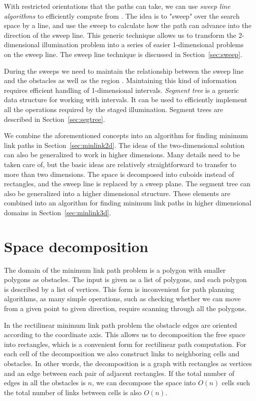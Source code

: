 \documentclass[english,gradu]{tktltiki2018}
\begin{document}
With restricted orientations that the paths can take, we can use \emph{sweep line algorithms} to efficiently compute  from .
The idea is to "sweep" over the search space by a line, and use the sweep to calculate how the path can advance into the direction of the sweep line.
This generic technique allows us to transform the 2-dimensional illumination problem into a series of easier 1-dimensional problems on the sweep line.
The sweep line technique is discussed in Section~\ref{sec:sweep}.

During the sweeps we need to maintain the relationship between the sweep line and the obstacles as well as the region .
Maintaining this kind of information requires efficient handling of 1-dimensional intervals.
\emph{Segment tree} is a generic data structure for working with intervals.
It can be used to efficiently implement all the operations required by the staged illumination.
Segment trees are described in Section~\ref{sec:segtree}.

We combine the aforementioned concepts into an algorithm for finding minimum link paths in Section~\ref{sec:minlink2d}.
The ideas of the two-dimensional solution can also be generalized to work in higher dimensions.
Many details need to be taken care of, but the basic ideas are relatively straightforward to transfer to more than two dimensions.
The space is decomposed into cuboids instead of rectangles, and the sweep line is replaced by a sweep plane.
The segment tree can also be generalized into a higher dimensional structure.
These elements are combined into an algorithm for finding minimum link paths in higher dimensional domains in Section~\ref{sec:minlink3d}.



\section{Space decomposition}\label{sec:decomposition}

The domain of the minimum link path problem is a polygon with smaller polygons as obstacles.
The input is given as a list of polygons, and each polygon is described by a list of vertices.
This form is inconvenient for path planning algorithms, as many simple operations, such as checking whether we can move from a given point to given direction, require scanning through all the polygons.

In the rectilinear minimum link path problem the obstacle edges are oriented according to the coordinate axis.
This allows us to decomposition the free space into rectangles, which is a convenient form for rectilinear path computation.
For each cell of the decomposition we also construct links to neighboring cells and obstacles.
In other words, the decomposition is a graph with rectangles as vertices and an edge between each pair of adjacent rectangles.
If the total number of edges in all the obstacles is $n$, we can decompose the space into $O(n)$ cells such the total number of links between cells is also $O(n)$.
\end{document}
